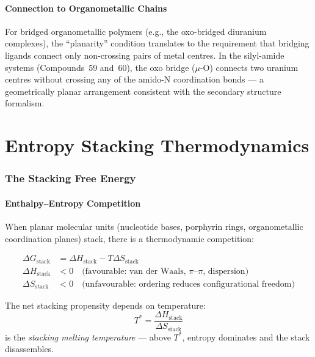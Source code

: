 \documentclass[11pt]{article}
\begin{document}
\subsection{Connection to Organometallic Chains}

For bridged organometallic polymers (e.g., the oxo-bridged diuranium
complexes), the ``planarity'' condition translates to the requirement
that bridging ligands connect only non-crossing pairs of metal centres.
In the silyl-amide systems (Compounds~59 and~60), the oxo bridge
($\mu$-O) connects two uranium centres without crossing any of the
amido-N coordination bonds --- a geometrically planar arrangement
consistent with the secondary structure formalism.


\part{Entropy Stacking Thermodynamics}

\section{The Stacking Free Energy}

\subsection{Enthalpy--Entropy Competition}

When planar molecular units (nucleotide bases, porphyrin rings,
organometallic coordination planes) stack, there is a thermodynamic
competition:

\begin{align}
  \Delta G_{\text{stack}} &= \Delta H_{\text{stack}}
                           - T \Delta S_{\text{stack}} \\
  \Delta H_{\text{stack}} &< 0
    \quad \text{(favourable: van der Waals, $\pi$--$\pi$, dispersion)} \\
  \Delta S_{\text{stack}} &< 0
    \quad \text{(unfavourable: ordering reduces configurational freedom)}
\end{align}

The net stacking propensity depends on temperature:
\begin{equation}
  T^{*} = \frac{\Delta H_{\text{stack}}}{\Delta S_{\text{stack}}}
\end{equation}
is the \emph{stacking melting temperature} --- above $T^{*}$, entropy
dominates and the stack disassembles.
\end{document}

